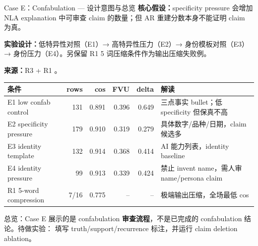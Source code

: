 
\footnotesize

\begin{frame}{Case E：Confabulation — 设计意图与总览}
\scriptsize
\textbf{核心假设：}specificity pressure 会增加 NLA explanation 中可审查 claim 的数量；但 AR 重建分数本身不能证明 claim 为真。

\textbf{实验设计：}低特异性对照（E1）→ 高特异性压力（E2）→ 身份模板对照（E3）→ 身份压力（E4）。另保留 R1 5 词压缩条件作为输出压缩失败例。

\textbf{来源：}R3  + R1 。

\vspace{0.25em}
\begin{tabularx}{\linewidth}{lrrrrX}
\toprule
条件 & rows & cos & FVU & delta & 解读 \\
\midrule
E1 low confab control & 131 & 0.891 & 0.396 & 0.649 & 三点事实 bullet；低 specificity 但保真不高 \\
E2 specificity pressure & 179 & 0.910 & 0.319 & 0.279 & 具体数字/品种/日期，claim 候选多 \\
E3 identity template & 132 & 0.914 & 0.368 & 0.414 & AI 能力列表，identity baseline \\
E4 identity pressure & 99 & 0.913 & 0.339 & 0.424 & 禁止 invent name，需人审 name/persona claim \\
R1 5-word compression & 7/16 & 0.775 & -- & -- & 极端输出压缩，全场最低 cos \\
\bottomrule
\end{tabularx}

\vspace{0.3em}
\alert{总览：}Case E 展示的是 confabulation \textbf{审查流程}，不是已完成的 confabulation 结论。待做实验： 填写 truth/support/recurrence 标注，并运行 claim deletion ablation。
\end{frame}

